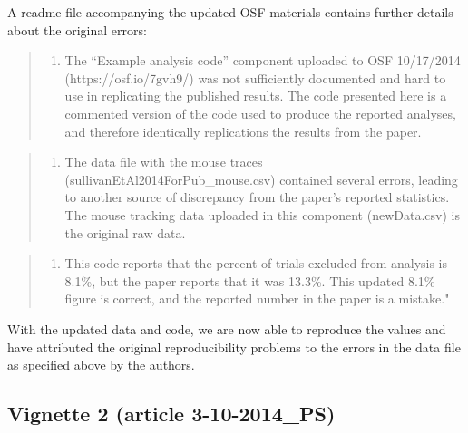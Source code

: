 \begin{appendix}
A readme file accompanying the updated OSF materials contains further
details about the original errors:

\begin{quote}
\begin{enumerate}
\def\labelenumi{\arabic{enumi})}
\tightlist
\item
  The ``Example analysis code'' component uploaded to OSF 10/17/2014
  (https://osf.io/7gvh9/) was not sufficiently documented and hard to
  use in replicating the published results. The code presented here is a
  commented version of the code used to produce the reported analyses,
  and therefore identically replications the results from the paper.
\end{enumerate}
\end{quote}

\begin{quote}
\begin{enumerate}
\def\labelenumi{\arabic{enumi})}
\setcounter{enumi}{1}
\tightlist
\item
  The data file with the mouse traces
  (sullivanEtAl2014ForPub\_mouse.csv) contained several errors, leading
  to another source of discrepancy from the paper's reported statistics.
  The mouse tracking data uploaded in this component (newData.csv) is
  the original raw data.
\end{enumerate}
\end{quote}

\begin{quote}
\begin{enumerate}
\def\labelenumi{\arabic{enumi})}
\setcounter{enumi}{2}
\tightlist
\item
  This code reports that the percent of trials excluded from analysis is
  8.1\%, but the paper reports that it was 13.3\%. This updated 8.1\%
  figure is correct, and the reported number in the paper is a mistake."
\end{enumerate}
\end{quote}

With the updated data and code, we are now able to reproduce the values
and have attributed the original reproducibility problems to the errors
in the data file as specified above by the authors.

\hypertarget{vignette-2-article-3-10-2014_ps}{%
\subsection{Vignette 2 (article
3-10-2014\_PS)}\label{vignette-2-article-3-10-2014_ps}}


\end{appendix}
